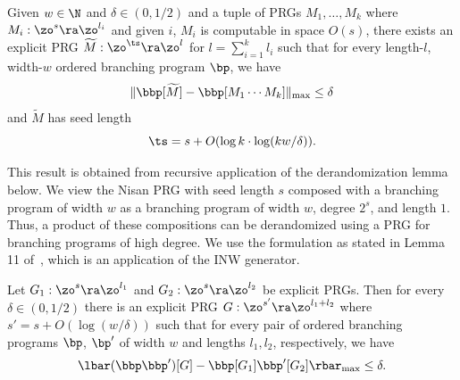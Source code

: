 \begin{lemma}
\label{lem:pathInnerTool}
Given $w\in \N$ and $\delta \in (0,1/2)$ and a tuple of PRGs $M_1,\ldots,M_{k}$ where $M_i:\zo^{s}\ra \zo^{l_i}$ and given $i$, $M_i$ is computable in space $O(s)$, there exists an explicit PRG $\widetilde{M}:\zo^{\ts}\ra\zo^l$ for $l=\sum_{i=1}^k l_i$ such that for every length-$l$, width-$w$ ordered branching program $\bp$, we have 
\[\|\bbp[\widetilde{M}]-\bbp[M_1\cdots M_k]\|_{\max}\leq \delta\] 
and $\widetilde{M}$ has seed length
\[\ts=s+O(\log k\cdot\log(kw/\delta)).\]
\end{lemma}

This result is obtained from recursive application of the derandomization lemma below. We view the Nisan PRG with seed length $s$ composed with a branching program of width $w$ as a branching program of width $w$, degree $2^s$, and length $1$. Thus, a product of these compositions can be derandomized using a PRG for branching programs of high degree. We use the formulation as stated in Lemma 11 of~\cite{ChattopadhyayLi20}, which is an application of the 
INW generator. %
\begin{lemma}
Let $G_1:\zo^s \ra \zo^{l_1}$ and $G_2:\zo^s\ra \zo^{l_2}$ be explicit PRGs. Then for every $\delta \in (0,1/2)$ there is an explicit PRG $G:\zo^{s'}\ra \zo^{l_1+l_2}$ where $s'=s+O(\log(w/\delta))$ such that for every pair of ordered branching programs $\bp$, $\bp'$ of width $w$ and lengths $l_1,l_2$, respectively, %
we have 
$$\lbar(\bbp\bbp')[G] -\bbp[G_1]\bbp'[G_2]\rbar_{\max}\leq \delta.$$
\end{lemma}

